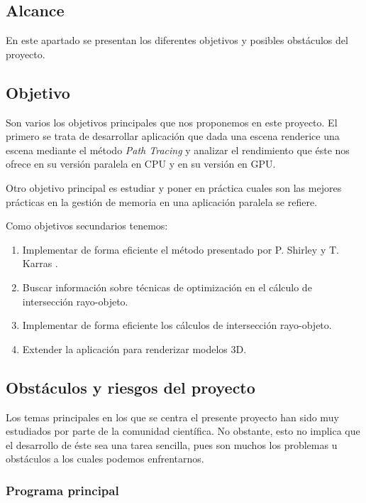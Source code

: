 \documentclass[titlepage,12pt]{report}
\begin{document}
\subsection{Alcance}

En este apartado se presentan los diferentes objetivos y posibles obstáculos del proyecto.

\subsection{Objetivo}

Son varios los objetivos principales que nos proponemos en este proyecto. El primero se trata de desarrollar aplicación que dada una escena renderice una escena mediante el método \textit{Path Tracing} y analizar el rendimiento que éste nos ofrece en su versión paralela en CPU y en su versión en GPU.

Otro objetivo principal es estudiar y poner en práctica cuales son las mejores prácticas en la gestión de memoria en una aplicación paralela se refiere.

Como objetivos secundarios tenemos:

\begin{enumerate}
	\item Implementar de forma eficiente el método presentado por P. Shirley \cite{Shirley2018a,Shirley2018b,Shirley2018a} y T. Karras \cite{Karras2012}.
	\item \label{ref:info} Buscar información sobre técnicas de optimización en el cálculo de intersección rayo-objeto.
	\item Implementar de forma eficiente los cálculos de intersección rayo-objeto.
	\item Extender la aplicación para renderizar modelos 3D.
\end{enumerate}

\subsection{Obstáculos y riesgos del proyecto}

Los temas principales en los que se centra el presente proyecto han sido muy estudiados por parte de la comunidad científica. No obstante, esto no implica que el desarrollo de éste sea una tarea sencilla, pues son muchos los problemas u obstáculos a los cuales podemos enfrentarnos.

\subsubsection{Programa principal}
\end{document}
